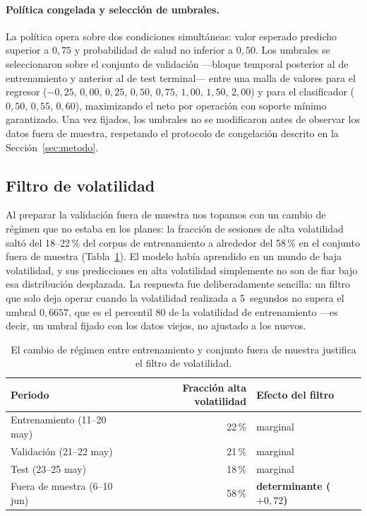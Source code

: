 \documentclass[11pt,a4paper]{article}
\begin{document}
\paragraph{Política congelada y selección de umbrales.}
La política opera sobre dos condiciones simultáneas: valor esperado predicho
superior a $0{,}75$ y probabilidad de salud no inferior a $0{,}50$. Los umbrales
se seleccionaron sobre el conjunto de validación ---bloque temporal posterior al
de entrenamiento y anterior al de test terminal--- entre una malla de valores
para el regresor ($-0{,}25$, $0{,}00$, $0{,}25$, $0{,}50$, $0{,}75$, $1{,}00$,
$1{,}50$, $2{,}00$) y para el clasificador ($0{,}50$, $0{,}55$, $0{,}60$),
maximizando el neto por operación con soporte mínimo garantizado. Una vez fijados,
los umbrales no se modificaron antes de observar los datos fuera de muestra,
respetando el protocolo de congelación descrito en la Sección~\ref{sec:metodo}.

\subsection{Filtro de volatilidad}

Al preparar la validación fuera de muestra nos topamos con un cambio de régimen que
no estaba en los planes: la fracción de sesiones de alta volatilidad saltó del
18--22\,\% del corpus de entrenamiento a alrededor del 58\,\% en el conjunto fuera
de muestra (Tabla~\ref{tab:regime}). El modelo había aprendido en un mundo de baja
volatilidad, y sus predicciones en alta volatilidad simplemente no son de fiar bajo
esa distribución desplazada. La respuesta fue deliberadamente sencilla: un filtro
que solo deja operar cuando la volatilidad realizada a 5~segundos no supera el
umbral $0{,}6657$, que es el percentil 80 de la volatilidad de entrenamiento ---es
decir, un umbral fijado con los datos viejos, no ajustado a los nuevos.

\begin{table}[H]
\centering
\small
\begin{tabular}{lrl}
\toprule
\textbf{Periodo} & \textbf{Fracción alta volatilidad} & \textbf{Efecto del filtro} \\
\midrule
Entrenamiento (11--20 may) & 22\,\% & marginal \\
Validación (21--22 may)    & 21\,\% & marginal \\
Test (23--25 may)          & 18\,\% & marginal \\
Fuera de muestra (6--10 jun) & 58\,\% & \textbf{determinante ($+0{,}72$)} \\
\bottomrule
\end{tabular}
\caption{El cambio de régimen entre entrenamiento y conjunto fuera de muestra
justifica el filtro de volatilidad.}
\label{tab:regime}
\end{table}
\end{document}

